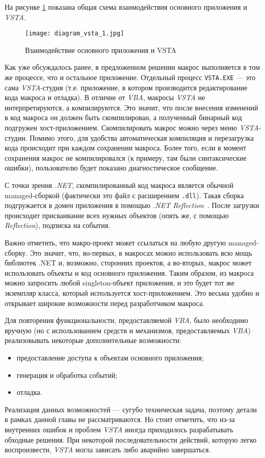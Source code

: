 На рисунке \ref{diagram_vsta_1} показана общая схема взаимодействия основного приложения и {\it VSTA}. 

\begin{figure}[!h]
    \centering
    \texttt{[image: diagram\_vsta\_1.jpg]}
    \caption{Взаимодействие основного приложения и VSTA}
    \label{diagram_vsta_1}
\end{figure} 

Как уже обсуждалось ранее, в предложенном решении макрос выполняется в том же процессе, что и остальное приложение. Отдельный процесс {\tt VSTA.EXE} –-- это сама {\it VSTA}-студия (т.е. приложение, в котором производится редактирование кода макроса и отладка). 
В отличие от {\it VBA}, макросы {\it VSTA} не интерпретируются, а компилируются. Это значит, что после внесения изменений в код макроса он должен быть скомпилирован, а полученный бинарный код подгружен хост-приложением. Скомпилировать макрос можно через меню {\it VSTA}-студии. Помимо этого, для удобства автоматическая компиляция и перезагрузка кода происходит при каждом сохранении макроса. Более того, если в момент сохранения макрос не компилировался (к примеру, там были синтаксические ошибки), пользователю будет показано диагностическое сообщение.

С точки зрения {\it .NET}, скомпилированный код макроса является обычной managed-сборкой (фактически это файл с расширением {\tt .dll}). Такая сборка подгружается в домен приложения в помощью {\it .NET Reflection}~\cite{cs2010-dotnet40}. После загрузки происходит присваивание всех нужных объектов (опять же, с помощью {\it Reflection}), подписка на события. 

Важно отметить, что макро-проект может ссылаться на любую другую managed-сборку. Это значит, что, во-первых, в макросах можно использовать всю мощь библиотек .NET и, возможно, сторонних проектов, а во-вторых, макрос может использовать объекты и код основного приложения. Таким образом, из макроса можно запросить любой singleton-объект приложения, и это будет тот же экземпляр класса, который используется хост-приложением. Это весьма удобно и открывает широкие возможности перед разработчиком макроса.

Для повторения функциональности, предоставляемой {\it VBA}, было необходимо вручную (но с использованием средств и механизмов, предоставляемых {\it VBA}) реализовывать некоторые дополнительные возможности:
\begin{itemize}
\item предоставление доступа к объектам основного приложения;
\item генерация и обработка событий;
\item отладка.
\end{itemize}
Реализация данных возможностей --- сугубо техническая задача, поэтому детали в рамках данной главы не рассматриваются. Но стоит отметить, что из-за внутренних ошибок и проблем {\it VSTA} иногда приходилось разрабатывать обходные решения. При некоторой последовательности действий, которую легко воспроизвести, {\it VSTA} могла зависать либо аварийно завершаться.

